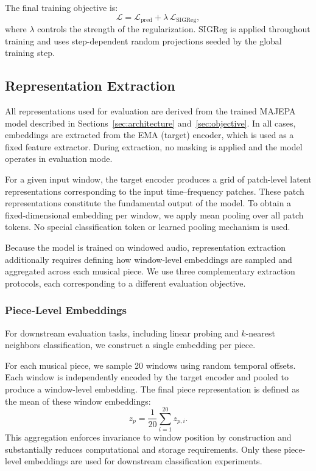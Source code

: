 \documentclass[10pt,twocolumn]{article}
\begin{document}
The final training objective is:
\[
\mathcal{L} = \mathcal{L}_{\text{pred}} + \lambda \, \mathcal{L}_{\text{SIGReg}},
\]
where $\lambda$ controls the strength of the regularization. SIGReg is applied throughout training and uses step-dependent random projections seeded by the global training step.

\subsection{Representation Extraction}
\label{sec:extraction}

All representations used for evaluation are derived from the trained MAJEPA model described in Sections~\ref{sec:architecture} and~\ref{sec:objective}. In all cases, embeddings are extracted from the EMA (target) encoder, which is used as a fixed feature extractor. During extraction, no masking is applied and the model operates in evaluation mode.

For a given input window, the target encoder produces a grid of patch-level latent representations corresponding to the input time--frequency patches. These patch representations constitute the fundamental output of the model. To obtain a fixed-dimensional embedding per window, we apply mean pooling over all patch tokens. No special classification token or learned pooling mechanism is used.

Because the model is trained on windowed audio, representation extraction additionally requires defining how window-level embeddings are sampled and aggregated across each musical piece. We use three complementary extraction protocols, each corresponding to a different evaluation objective.

\subsubsection{Piece-Level Embeddings}
For downstream evaluation tasks, including linear probing and $k$-nearest neighbors classification, we construct a single embedding per piece.

For each musical piece, we sample 20 windows using random temporal offsets. Each window is independently encoded by the target encoder and pooled to produce a window-level embedding. The final piece representation is defined as the mean of these window embeddings:
\[
z_p = \frac{1}{20} \sum_{i=1}^{20} z_{p,i}.
\]
This aggregation enforces invariance to window position by construction and substantially reduces computational and storage requirements. Only these piece-level embeddings are used for downstream classification experiments.
\end{document}
